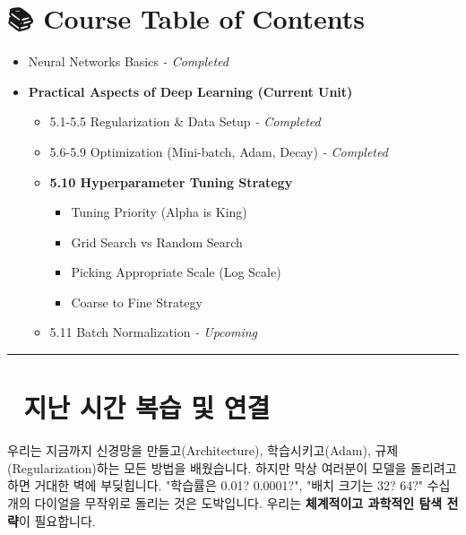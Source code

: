 \documentclass[11pt,a4paper]{book}
\theoremstyle{definition}
\begin{document}
\section*{📚 Course Table of Contents}
\begin{itemize}
    \item[Chapter 1-4.] Neural Networks Basics \textit{- Completed}
    \item[\textbf{Chapter 5.}] \textbf{Practical Aspects of Deep Learning (Current Unit)}
    \begin{itemize}
        \item 5.1-5.5 Regularization \& Data Setup \textit{- Completed}
        \item 5.6-5.9 Optimization (Mini-batch, Adam, Decay) \textit{- Completed}
        \item \textbf{5.10 Hyperparameter Tuning Strategy}
        \begin{itemize}
            \item Tuning Priority (Alpha is King)
            \item Grid Search vs Random Search
            \item Picking Appropriate Scale (Log Scale)
            \item Coarse to Fine Strategy
        \end{itemize}
        \item 5.11 Batch Normalization \textit{- Upcoming}
    \end{itemize}
\end{itemize}

\vspace{0.5cm}
\hrule
\vspace{0.5cm}

\section*{🔗 지난 시간 복습 및 연결}
우리는 지금까지 신경망을 만들고(Architecture), 학습시키고(Adam), 규제(Regularization)하는 모든 방법을 배웠습니다.
하지만 막상 여러분이 모델을 돌리려고 하면 거대한 벽에 부딪힙니다.
"학습률은 0.01? 0.0001?", "배치 크기는 32? 64?"
수십 개의 다이얼을 무작위로 돌리는 것은 도박입니다. 우리는 \textbf{체계적이고 과학적인 탐색 전략}이 필요합니다.

\end{document}

